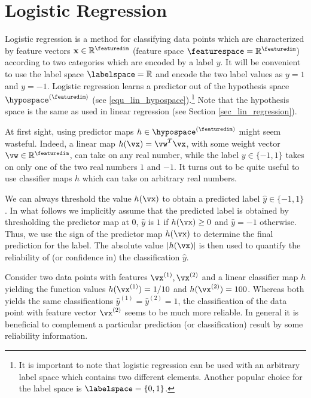 \documentclass[12pt]{report}
\begin{document}
\section{Logistic Regression} 
\label{sec_LogReg}

Logistic regression is a method for classifying data points which are characterized by 
feature vectors $\mathbf{x} \in \mathbb{R}^{\featuredim}$ (feature space $\featurespace=\mathbb{R}^{\featuredim}$) 
according to two categories which are encoded by a label $y$. It will be convenient to 
use the label space $\labelspace = \mathbb{R}$ and encode the two label values 
as $y=1$ and $y=-1$. Logistic regression learns a predictor out of the hypothesis space 
$\hypospace^{(\featuredim)}$ (see \eqref{equ_lin_hypospace}).\footnote{It is important to 
	note that logistic regression can be used with an arbitrary label space which contains 
	two different elements. Another popular choice for the label space is $\labelspace=\{0,1\}$.} 
Note that the hypothesis space is the same as used in linear regression (see Section \ref{sec_lin_regression}). 

At first sight, using predictor maps $h \in \hypospace^{(\featuredim)}$ might seem wasteful. 
Indeed, a linear map $h(\vx) = \vw^T \vx$, with some weight vector $\vw \in \mathbb{R}^{\featuredim}$, 
can take on any real number, while the label $y \in \{-1,1\}$ takes on only one of the two 
real numbers $1$ and $-1$. It turns out to be quite useful to use classifier maps 
$h$ which can take on arbitrary real numbers. 

We can always threshold the value $h(\vx)$ to obtain a predicted label $\hat{y} \in \{-1,1\}$. 
In what follows we implicitly assume that the predicted label is obtained by thresholding the 
predictor map at $0$, $\hat{y}$ is $1$ if $h(\vx)\geq 0$ and $\hat{y}=-1$ otherwise. Thus, 
we use the sign of the predictor map $h(\vx)$ to determine the final prediction for the label. 
The absolute value $|h(\vx)|$ is then used to quantify the reliability of (or confidence in) the 
classification $\hat{y}$. 

Consider two data points with features $\vx^{(1)}, \vx^{(2)}$ and a linear classifier map $h$ yielding 
the function values $h(\vx^{(1)}) = 1/10$ and $h(\vx^{(2)}) = 100$. Whereas both yields the same 
classifications $\hat{y}^{(1)}\!=\!\hat{y}^{(2)}\!=\!1$, the classification of the data point with feature 
vector $\vx^{(2)}$ seems to be much more reliable. In general it is beneficial to complement a particular 
prediction (or classification) result by some reliability information. 
\end{document}
